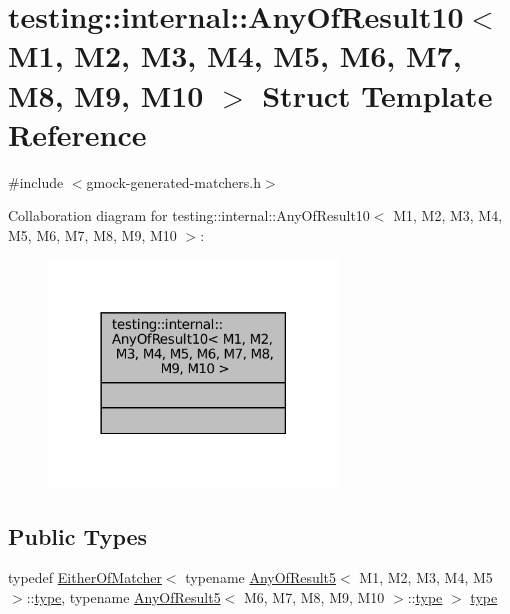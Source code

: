 \hypertarget{structtesting_1_1internal_1_1AnyOfResult10}{}\section{testing\+:\+:internal\+:\+:Any\+Of\+Result10$<$ M1, M2, M3, M4, M5, M6, M7, M8, M9, M10 $>$ Struct Template Reference}
\label{structtesting_1_1internal_1_1AnyOfResult10}


{\ttfamily \#include $<$gmock-\/generated-\/matchers.\+h$>$}



Collaboration diagram for testing\+:\+:internal\+:\+:Any\+Of\+Result10$<$ M1, M2, M3, M4, M5, M6, M7, M8, M9, M10 $>$\+:
\nopagebreak
\begin{figure}[H]
\begin{center}
\leavevmode
\includegraphics[width=218pt]{structtesting_1_1internal_1_1AnyOfResult10__coll__graph}
\end{center}
\end{figure}
\subsection*{Public Types}
\begin{DoxyCompactItemize}
\item 
typedef \hyperlink{classtesting_1_1internal_1_1EitherOfMatcher}{Either\+Of\+Matcher}$<$ typename \hyperlink{structtesting_1_1internal_1_1AnyOfResult5}{Any\+Of\+Result5}$<$ M1, M2, M3, M4, M5 $>$\+::\hyperlink{structtesting_1_1internal_1_1AnyOfResult10_aa1cb3d733f29716f2015db8a2b6c1c94}{type}, typename \hyperlink{structtesting_1_1internal_1_1AnyOfResult5}{Any\+Of\+Result5}$<$ M6, M7, M8, M9, M10 $>$\+::\hyperlink{structtesting_1_1internal_1_1AnyOfResult10_aa1cb3d733f29716f2015db8a2b6c1c94}{type} $>$ \hyperlink{structtesting_1_1internal_1_1AnyOfResult10_aa1cb3d733f29716f2015db8a2b6c1c94}{type}
\end{DoxyCompactItemize}


